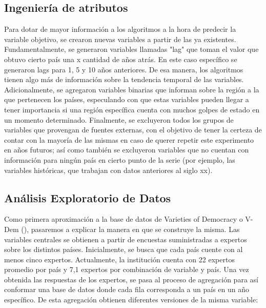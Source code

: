 \documentclass{article}
\begin{document}
\subsection{Ingeniería de atributos}
Para dotar de mayor información a los algoritmos a la hora de predecir la variable
objetivo, se crearon nuevas variables a partir de las ya existentes. Fundamentalmente,
se generaron variables llamadas "lag" que toman el valor que obtuvo cierto país una x
cantidad de años atrás. En este caso específico se generaron lags para 1, 5 y 10 años 
anteriores. De esa manera, los algoritmos tienen algo más de información sobre la 
tendencia temporal de las variables. Adicionalmente, se agregaron variables binarias
que informan sobre la región a la que pertenecen los países, especulando con que estas
variables pueden llegar a tener importancia si una región específica cuenta con muchos
golpes de estado en un momento determinado. Finalmente, se excluyeron todos los grupos
de variables que provengan de fuentes externas, con el objetivo de tener la certeza de
contar con la mayoría de las mismas en caso de querer repetir este experimento en años 
futuros; así como también se excluyeron variables que no cuentan con información para 
ningún país en cierto punto de la serie (por ejemplo, las variables históricas, que 
trabajan con datos anteriores al siglo xx).

\subsection{Análisis Exploratorio de Datos}
Como primera aproximación a la base de datos de Varieties of Democracy o V-Dem 
(\cite{CopMet24}), pasaremos a explicar la manera en que se construye la misma. Las
variables centrales se obtienen a partir de encuestas suministradas a expertos
sobre los distintos países. Inicialmente, se busca que cada país cuente con al menos
cinco expertos. Actualmente, la institución cuenta con 22 expertos promedio por país
y 7,1 expertos por combinación de variable y país. Una vez obtenida las respuestas
de los expertos, se pasa al proceso de agregación para así conformar una base de 
datos donde cada fila corresponda a un país en un año específico. De esta agregación
obtienen diferentes versiones de la misma variable:
\end{document}

